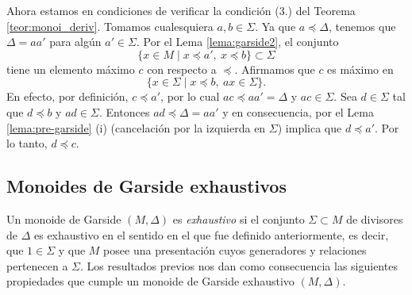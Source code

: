 \documentclass[12pt]{book}
\theoremstyle{definition}
\begin{document}
Ahora estamos en condiciones de verificar la condición (3.) del Teorema \ref{teor:monoi_deriv}. Tomamos cualesquiera $a,b\in\Sigma$. Ya que $a\preceq\Delta$, tenemos que $\Delta=aa'$ para algún $a'\in\Sigma$. Por el Lema \ref{lema:garside2}, el conjunto
$$\{x\in M\mid x\preceq a',\ x\preceq b\}\subset\Sigma$$ tiene un elemento máximo $c$ con respecto a $\preceq$. Afirmamos que $c$ es máximo en 
$$\{x\in\Sigma\mid x\preceq b,\ ax\in\Sigma\}.$$
En efecto, por definición, $c\preceq a'$, por lo cual $ac\preceq aa'=\Delta$ y $ac\in\Sigma$. Sea $d\in\Sigma$ tal que $d\preceq b$ y $ad\in\Sigma$. Entonces $ad\preceq\Delta=aa'$ y en consecuencia, por el Lema \ref{lema:pre-garside} (i) (cancelación por la izquierda en $\Sigma$) implica que $d\preceq a'$. Por lo tanto, $d\preceq c$.

\subsection{Monoides de Garside exhaustivos}

Un monoide de Garside $(M,\Delta)$ es \textit{exhaustivo} si el conjunto $\Sigma\subset M$ de divisores de $\Delta$ es exhaustivo en el sentido en el que fue definido anteriormente, es decir, que $1\in\Sigma$ y que $M$ posee una presentación cuyos generadores y relaciones pertenecen a $\Sigma$. Los resultados previos nos dan como consecuencia las siguientes propiedades que cumple un monoide de Garside exhaustivo $(M,\Delta)$.
\end{document}
